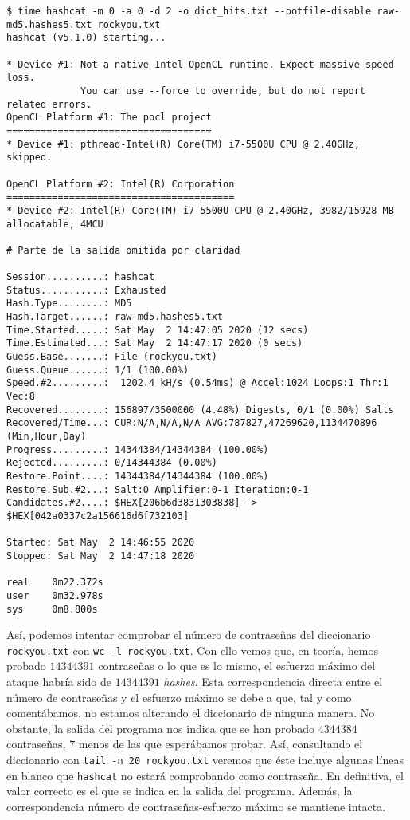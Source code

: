 \documentclass{article}
\begin{document}
            \begin{verbatim}
$ time hashcat -m 0 -a 0 -d 2 -o dict_hits.txt --potfile-disable raw-md5.hashes5.txt rockyou.txt
hashcat (v5.1.0) starting...

* Device #1: Not a native Intel OpenCL runtime. Expect massive speed loss.
             You can use --force to override, but do not report related errors.
OpenCL Platform #1: The pocl project
====================================
* Device #1: pthread-Intel(R) Core(TM) i7-5500U CPU @ 2.40GHz, skipped.

OpenCL Platform #2: Intel(R) Corporation
========================================
* Device #2: Intel(R) Core(TM) i7-5500U CPU @ 2.40GHz, 3982/15928 MB allocatable, 4MCU

# Parte de la salida omitida por claridad

Session..........: hashcat
Status...........: Exhausted
Hash.Type........: MD5
Hash.Target......: raw-md5.hashes5.txt
Time.Started.....: Sat May  2 14:47:05 2020 (12 secs)
Time.Estimated...: Sat May  2 14:47:17 2020 (0 secs)
Guess.Base.......: File (rockyou.txt)
Guess.Queue......: 1/1 (100.00%)
Speed.#2.........:  1202.4 kH/s (0.54ms) @ Accel:1024 Loops:1 Thr:1 Vec:8
Recovered........: 156897/3500000 (4.48%) Digests, 0/1 (0.00%) Salts
Recovered/Time...: CUR:N/A,N/A,N/A AVG:787827,47269620,1134470896 (Min,Hour,Day)
Progress.........: 14344384/14344384 (100.00%)
Rejected.........: 0/14344384 (0.00%)
Restore.Point....: 14344384/14344384 (100.00%)
Restore.Sub.#2...: Salt:0 Amplifier:0-1 Iteration:0-1
Candidates.#2....: $HEX[206b6d3831303838] -> $HEX[042a0337c2a156616d6f732103]

Started: Sat May  2 14:46:55 2020
Stopped: Sat May  2 14:47:18 2020

real    0m22.372s
user    0m32.978s
sys     0m8.800s
            \end{verbatim}

            Así, podemos intentar comprobar el número de contraseñas del diccionario \texttt{rockyou.txt} con \texttt{wc -l rockyou.txt}. Con ello vemos que, en teoría, hemos probado $14344391$ contraseñas o lo que es lo mismo, el esfuerzo máximo del ataque habría sido de $14344391$ \textit{hashes}. Esta correspondencia directa entre el número de contraseñas y el esfuerzo máximo se debe a que, tal y como comentábamos, no estamos alterando el diccionario de ninguna manera. No obstante, la salida del programa nos indica que se han probado $4344384$ contraseñas, $7$ menos de las que esperábamos probar. Así, consultando el diccionario con \texttt{tail -n 20 rockyou.txt} veremos que éste incluye algunas líneas en blanco que \texttt{hashcat} no estará comprobando como contraseña. En definitiva, el valor correcto es el que se indica en la salida del programa. Además, la correspondencia número de contraseñas-esfuerzo máximo se mantiene intacta.
\end{document}
